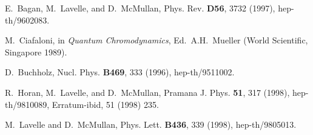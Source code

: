 \documentclass[12pt,a4paper]{article}
\begin{document}
\begin{thebibliography}{10}
E.~Bagan, M.~Lavelle, and D.~McMullan,
\newblock Phys. Rev. {\bf D56}, 3732 (1997), hep-th/9602083.

M.~Ciafaloni,
\newblock in \textit{Quantum Chromodynamics}, Ed.~A.H.~Mueller (World
  Scientific, Singapore 1989).

D.~Buchholz,
\newblock Nucl. Phys. {\bf B469}, 333 (1996), hep-th/9511002.

R.~Horan, M.~Lavelle, and D.~McMullan,
\newblock Pramana J. Phys. {\bf 51}, 317 (1998), hep-th/9810089,
\newblock Erratum-ibid, 51 (1998) 235.

M.~Lavelle and D.~McMullan,
\newblock Phys. Lett. {\bf B436}, 339 (1998), hep-th/9805013.

\end{thebibliography}




\end{document}
